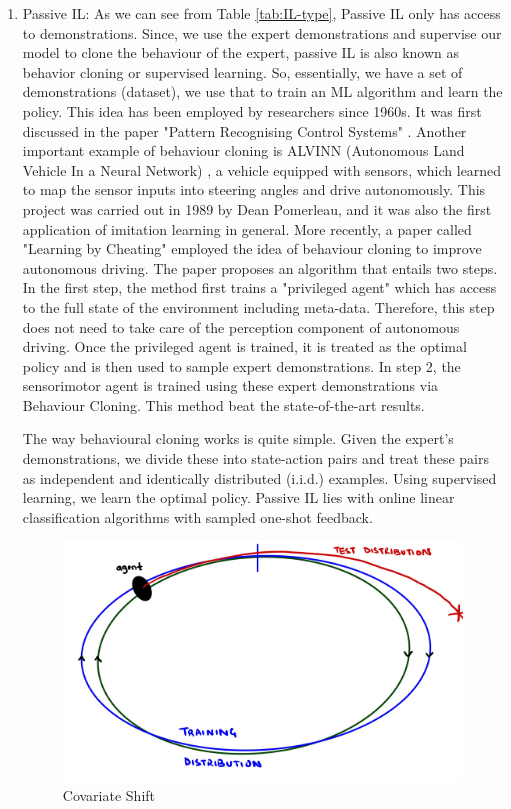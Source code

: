 \documentclass[11pt]{article}
\begin{document}
\begin{enumerate}
    \item Passive IL: As we can see from Table \ref{tab:IL-type}, Passive IL only has access to demonstrations. Since, we use the expert demonstrations and supervise our model to clone the behaviour of the expert, passive IL is also known as behavior cloning or supervised learning. So, essentially, we have a set of demonstrations (dataset), we use that to train an ML algorithm and learn the policy. This idea has been employed by researchers since 1960s. It was first discussed in the paper "Pattern Recognising Control Systems" \cite{widrow1964pattern}. Another important example of behaviour cloning is ALVINN (Autonomous Land Vehicle In a Neural Network) \cite{pomerleau1988alvinn}, a vehicle equipped with sensors, which learned to map the sensor inputs into steering angles and drive autonomously. This project was carried out in 1989 by Dean Pomerleau, and it was also the first application of imitation learning in general. More recently, a paper called "Learning by Cheating" \cite{chen2020learning} employed the idea of behaviour cloning to improve autonomous driving. The paper proposes an algorithm that entails two steps. In the first step, the method first trains a "privileged agent" which has access to the full state of the environment including meta-data. Therefore, this step does not need to take care of the perception component of autonomous driving. Once the privileged agent is trained, it is treated as the optimal policy and is then used to sample expert demonstrations. In step 2, the sensorimotor agent is trained using these expert demonstrations via Behaviour Cloning. This method beat the state-of-the-art results. 
    
    The way behavioural cloning works is quite simple. Given the expert’s demonstrations, we divide these into state-action pairs and treat these pairs as independent and identically distributed (i.i.d.) examples. Using supervised learning, we learn the optimal policy. Passive IL lies with online linear classification algorithms with sampled one-shot feedback.
    \begin{figure}[H]
\centering
\includegraphics[width=0.8\linewidth]{figs/Image-1(1).jpg}
\caption{Covariate Shift}
\label{fig:ncs}
\end{figure}
    

\end{enumerate}
\end{document}
